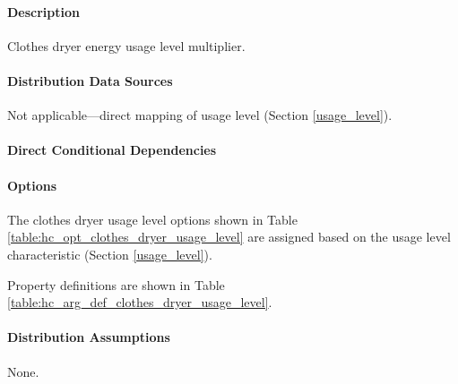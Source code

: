 \paragraph{Description}
% 
Clothes dryer energy usage level multiplier.

\paragraph{Distribution Data Sources}
% 
Not applicable---direct mapping of usage level (Section \ref{usage_level}).

\paragraph{Direct Conditional Dependencies}


\paragraph{Options}
The clothes dryer usage level options shown in Table \ref{table:hc_opt_clothes_dryer_usage_level} are assigned based on the usage level characteristic (Section \ref{usage_level}).



Property definitions are shown in Table \ref{table:hc_arg_def_clothes_dryer_usage_level}.



\paragraph{Distribution Assumptions}
% 
None.

